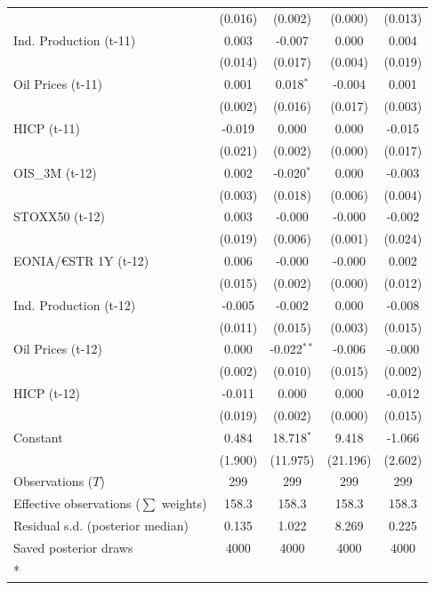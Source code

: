 \begin{longtable}[t]{lcccc}
 & (0.016) & (0.002) & (0.000) & (0.013)\\
Ind. Production (t-11) & 0.003 & -0.007 & 0.000 & 0.004\\
 & (0.014) & (0.017) & (0.004) & (0.019)\\
Oil Prices (t-11) & 0.001 & 0.018$^{*}$ & -0.004 & 0.001\\
 & (0.002) & (0.016) & (0.017) & (0.003)\\
HICP (t-11) & -0.019 & 0.000 & 0.000 & -0.015\\
 & (0.021) & (0.002) & (0.000) & (0.017)\\
OIS\_3M (t-12) & 0.002 & -0.020$^{*}$ & 0.000 & -0.003\\
 & (0.003) & (0.018) & (0.006) & (0.004)\\
STOXX50 (t-12) & 0.003 & -0.000 & -0.000 & -0.002\\
 & (0.019) & (0.006) & (0.001) & (0.024)\\
EONIA/€STR 1Y (t-12) & 0.006 & -0.000 & -0.000 & 0.002\\
 & (0.015) & (0.002) & (0.000) & (0.012)\\
Ind. Production (t-12) & -0.005 & -0.002 & 0.000 & -0.008\\
 & (0.011) & (0.015) & (0.003) & (0.015)\\
Oil Prices (t-12) & 0.000 & -0.022$^{**}$ & -0.006 & -0.000\\
 & (0.002) & (0.010) & (0.015) & (0.002)\\
HICP (t-12) & -0.011 & 0.000 & 0.000 & -0.012\\
 & (0.019) & (0.002) & (0.000) & (0.015)\\
Constant & 0.484 & 18.718$^{*}$ & 9.418 & -1.066\\
 & (1.900) & (11.975) & (21.196) & (2.602)\\
\midrule
Observations ($T$) & 299 & 299 & 299 & 299\\
Effective observations ($\sum$ weights) & 158.3 & 158.3 & 158.3 & 158.3\\
Residual s.d. (posterior median) & 0.135 & 1.022 & 8.269 & 0.225\\
Saved posterior draws & 4000 & 4000 & 4000 & 4000\\*
\end{longtable}
\endgroup{}

